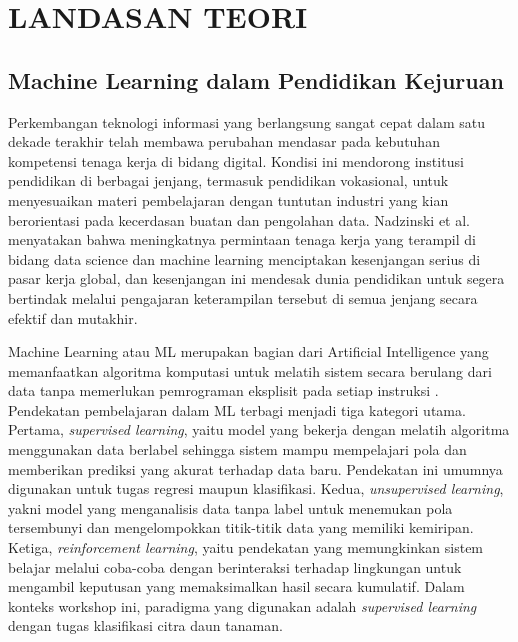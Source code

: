 \clearpage
\section{LANDASAN TEORI}

\subsection{Machine Learning dalam Pendidikan Kejuruan}
Perkembangan teknologi informasi yang berlangsung sangat cepat dalam satu dekade terakhir telah membawa perubahan mendasar pada kebutuhan kompetensi tenaga kerja di bidang digital. Kondisi ini mendorong institusi pendidikan di berbagai jenjang, termasuk pendidikan vokasional, untuk menyesuaikan materi pembelajaran dengan tuntutan industri yang kian berorientasi pada kecerdasan buatan dan pengolahan data. Nadzinski et al.\ \cite{Nadzinski2023} menyatakan bahwa meningkatnya permintaan tenaga kerja yang terampil di bidang data science dan machine learning menciptakan kesenjangan serius di pasar kerja global, dan kesenjangan ini mendesak dunia pendidikan untuk segera bertindak melalui pengajaran keterampilan tersebut di semua jenjang secara efektif dan mutakhir.

Machine Learning atau ML merupakan bagian dari Artificial Intelligence yang memanfaatkan algoritma komputasi untuk melatih sistem secara berulang dari data tanpa memerlukan pemrograman eksplisit pada setiap instruksi \cite{Obada2024,Suthar2022}. Pendekatan pembelajaran dalam ML terbagi menjadi tiga kategori utama. Pertama, \textit{supervised learning}, yaitu model yang bekerja dengan melatih algoritma menggunakan data berlabel sehingga sistem mampu mempelajari pola dan memberikan prediksi yang akurat terhadap data baru. Pendekatan ini umumnya digunakan untuk tugas regresi maupun klasifikasi. Kedua, \textit{unsupervised learning}, yakni model yang menganalisis data tanpa label untuk menemukan pola tersembunyi dan mengelompokkan titik-titik data yang memiliki kemiripan. Ketiga, \textit{reinforcement learning}, yaitu pendekatan yang memungkinkan sistem belajar melalui coba-coba dengan berinteraksi terhadap lingkungan untuk mengambil keputusan yang memaksimalkan hasil secara kumulatif. Dalam konteks workshop ini, paradigma yang digunakan adalah \textit{supervised learning} dengan tugas klasifikasi citra daun tanaman.

